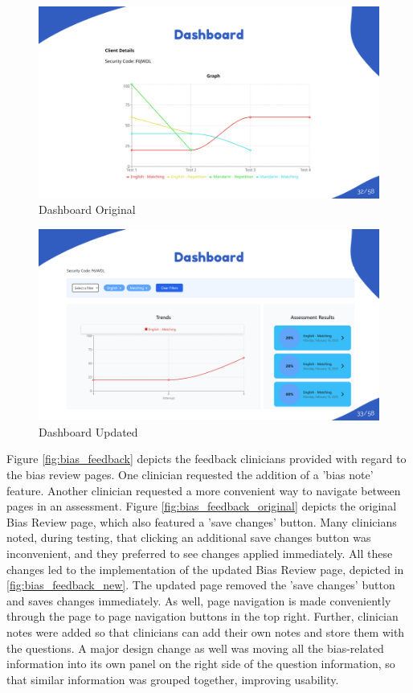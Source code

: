 \documentclass{article}
\begin{document}
\begin{figure}[H]
  \centering
  \includegraphics[width=\textwidth]{images/slide32.png}
  \caption{Dashboard Original}
  \label{fig:dashboard_original}
\end{figure}

\begin{figure}[H]
  \centering
  \includegraphics[width=\textwidth]{images/slide33.png}
  \caption{Dashboard Updated}
  \label{fig:dashboard_new}
\end{figure}

Figure \ref{fig:bias_feedback} depicts the feedback clinicians provided with regard to the bias review pages. One clinician requested the addition of a 'bias note' feature. Another clinician requested a more convenient way to navigate between pages in an assessment.
Figure \ref{fig:bias_feedback_original} depicts the original Bias Review page, which also featured a 'save changes' button. Many clinicians noted, during testing, that clicking an additional save changes button was inconvenient, and they
preferred to see changes applied immediately. All these changes led to the implementation of the updated Bias Review page, depicted in \ref{fig:bias_feedback_new}.
The updated page removed the 'save changes' button and saves changes immediately. As well, page navigation is made conveniently through the page to page navigation buttons in the top right.
Further, clinician notes were added so that clinicians can add their own notes and store them with the questions.
A major design change as well was moving all the bias-related information into its own panel on the right side of the question information, so that similar information was grouped together, improving usability.
\end{document}
